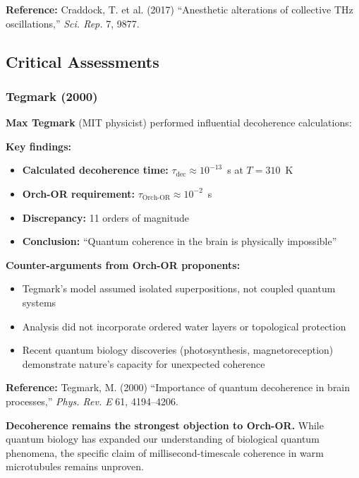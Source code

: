 \textbf{Reference:} Craddock, T. et al. (2017) ``Anesthetic alterations of collective THz oscillations,'' \textit{Sci. Rep.} 7, 9877.

\subsection{Critical Assessments}

\subsubsection{Tegmark (2000)}

\textbf{Max Tegmark} (MIT physicist) performed influential decoherence calculations:

\textbf{Key findings:}
\begin{itemize}
\item \textbf{Calculated decoherence time:} $\tau_{\text{dec}} \approx 10^{-13}$~s at $T = 310$~K
\item \textbf{Orch-OR requirement:} $\tau_{\text{Orch-OR}} \approx 10^{-2}$~s
\item \textbf{Discrepancy:} 11 orders of magnitude
\item \textbf{Conclusion:} ``Quantum coherence in the brain is physically impossible''
\end{itemize}

\textbf{Counter-arguments from Orch-OR proponents:}
\begin{itemize}
\item Tegmark's model assumed isolated superpositions, not coupled quantum systems
\item Analysis did not incorporate ordered water layers or topological protection
\item Recent quantum biology discoveries (photosynthesis, magnetoreception) demonstrate nature's capacity for unexpected coherence
\end{itemize}

\textbf{Reference:} Tegmark, M. (2000) ``Importance of quantum decoherence in brain processes,'' \textit{Phys. Rev. E} 61, 4194--4206.

\begin{warningbox}
\textbf{Decoherence remains the strongest objection to Orch-OR.} While quantum biology has expanded our understanding of biological quantum phenomena, the specific claim of millisecond-timescale coherence in warm microtubules remains unproven.
\end{warningbox}

